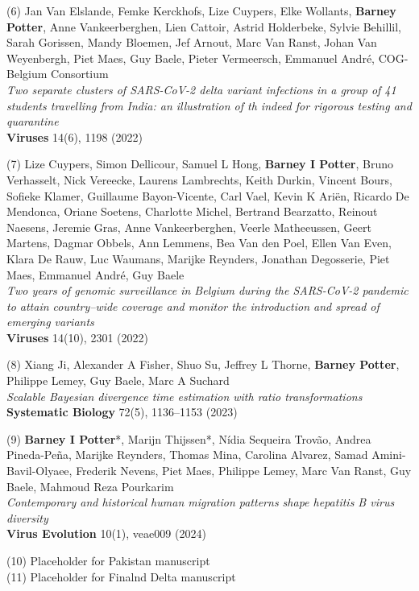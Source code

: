 (6) Jan Van Elslande, Femke Kerckhofs, Lize Cuypers, Elke Wollants, \textbf{Barney Potter}, Anne Vankeerberghen, Lien Cattoir, Astrid Holderbeke, Sylvie Behillil, Sarah Gorissen, Mandy Bloemen, Jef Arnout, Marc Van Ranst, Johan Van Weyenbergh, Piet Maes, Guy Baele, Pieter Vermeersch, Emmanuel André, COG-Belgium Consortium\\
\textit{Two separate clusters of SARS-CoV-2 delta variant infections in a group of 41 students travelling from India: an illustration of th indeed for rigorous testing and quarantine}\\
\textbf{Viruses} 14(6), 1198 (2022)

(7) Lize Cuypers, Simon Dellicour, Samuel L Hong, \textbf{Barney I Potter}, Bruno Verhasselt, Nick Vereecke, Laurens Lambrechts, Keith Durkin, Vincent Bours, Sofieke Klamer, Guillaume Bayon-Vicente, Carl Vael, Kevin K Ariën, Ricardo De Mendonca, Oriane Soetens, Charlotte Michel, Bertrand Bearzatto, Reinout Naesens, Jeremie Gras, Anne Vankeerberghen, Veerle Matheeussen, Geert Martens, Dagmar Obbels, Ann Lemmens, Bea Van den Poel, Ellen Van Even, Klara De Rauw, Luc Waumans, Marijke Reynders, Jonathan Degosserie, Piet Maes, Emmanuel André, Guy Baele\\
\textit{Two years of genomic surveillance in Belgium during the SARS-CoV-2 pandemic to attain country–wide coverage and monitor the introduction and spread of emerging variants}\\
\textbf{Viruses} 14(10), 2301 (2022)

(8) Xiang Ji, Alexander A Fisher, Shuo Su, Jeffrey L Thorne, \textbf{Barney Potter}, Philippe Lemey, Guy Baele, Marc A Suchard\\
\textit{Scalable Bayesian divergence time estimation with ratio transformations}\\
\textbf{Systematic Biology} 72(5), 1136–1153 (2023)

(9) \textbf{Barney I Potter}*, Marijn Thijssen*, Nídia Sequeira Trovão, Andrea Pineda-Peña, Marijke Reynders, Thomas Mina, Carolina Alvarez, Samad Amini-Bavil-Olyaee, Frederik Nevens, Piet Maes, Philippe Lemey, Marc Van Ranst, Guy Baele, Mahmoud Reza Pourkarim\\
\textit{Contemporary and historical human migration patterns shape hepatitis B virus diversity}\\
\textbf{Virus Evolution} 10(1), veae009 (2024)

(10) Placeholder for Pakistan manuscript\\

(11) Placeholder for Finalnd Delta manuscript\\

\cleardoublepage

